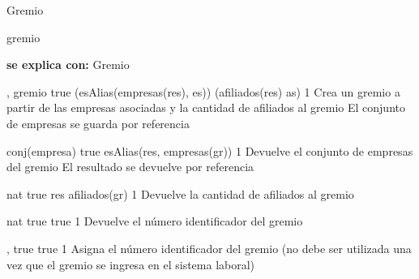 \begin{interfaz}{Gremio}

\begin{iparamformales}{gremio}

\textbf{\large se explica con:} Gremio

\end{iparamformales}

{, }{gremio}
{true}
{(esAlias(empresas(res), es)) \land (afiliados(res) \igobs as)}
{1}
{Crea un gremio a partir de las empresas asociadas y la cantidad de afiliados al gremio}
{El conjunto de empresas se guarda por referencia}

{}{conj(empresa)}
{true}
{esAlias(res, empresas(gr))}
{1}
{Devuelve el conjunto de empresas del gremio}
{El resultado se devuelve por referencia}

{}{nat}
{true}
{res \igobs afiliados(gr)}
{1}
{Devuelve la cantidad de afiliados al gremio}
{}

{}{nat}
{true}
{true}
{1}
{Devuelve el número identificador del gremio}
{}

{, }{}
{true}
{true}
{1}
{Asigna el número identificador del gremio (no debe ser utilizada una vez que el gremio se ingresa en el sistema laboral)}
{}

\end{interfaz}